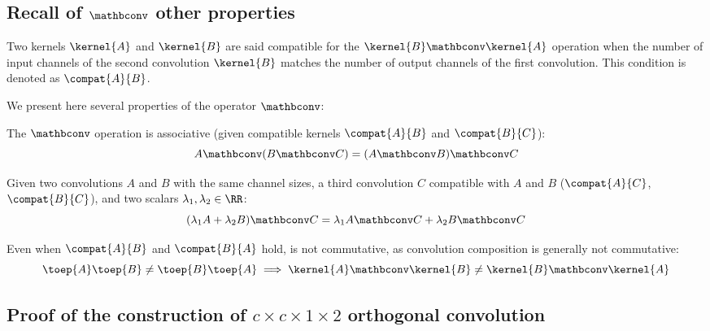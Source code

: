     \subsection{Recall of $\mathbconv$ other properties}
Two kernels $\kernel{A}$ and $\kernel{B}$ are said compatible for the $\kernel{B}\mathbconv\kernel{A}$ operation when the number of input channels of the second convolution $\kernel{B}$ matches the number of output channels of the first convolution. This condition is denoted as $\compat{A}{B}$.

We present here several properties of the  \Bconv{} operator  $\mathbconv$: 
    
        \begin{proposition}[Associativity]\label{prop:associativity} The $\mathbconv$ operation is associative (given compatible kernels $\compat{A}{B}$ and $\compat{B}{C}$): 
            \[ A \mathbconv (B \mathbconv C) = (A \mathbconv B) \mathbconv C \]
            
        \end{proposition}
        
        \begin{proposition}[Bi-linearity]\label{prop:bilinear} Given two convolutions $A$ and $B$ with the same channel sizes, a third convolution $C$ compatible with $A$ and $B$ ($\compat{A}{C}$, $\compat{B}{C}$), and two scalars $\lambda_1, \lambda_2 \in \RR$:
            \[ (\lambda_1 A + \lambda_2 B) \mathbconv C = \lambda_1 A \mathbconv C +  \lambda_2 B \mathbconv C 
            \]
        \end{proposition}
        
        \begin{proposition} Even when $\compat{A}{B}$ and $\compat{B}{A}$ hold, \Bconv{} is not commutative, as convolution composition is generally not commutative:
        \[
            \toep{A} \toep{B} \neq \toep{B} \toep{A} \implies \kernel{A} \mathbconv \kernel{B} \neq \kernel{B} \mathbconv \kernel{A} 
        \]
        \end{proposition}

    \subsection{Proof of the construction of $c\times c \times 1 \times 2$ orthogonal convolution}\label{sec:ap_1x2_ortho}


